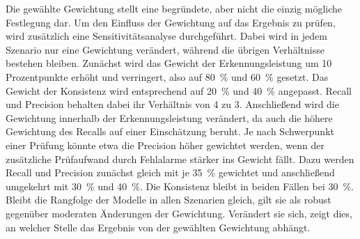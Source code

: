 Die gewählte Gewichtung stellt eine begründete, aber nicht die einzig mögliche Festlegung dar. Um den Einfluss der Gewichtung auf das Ergebnis zu prüfen, wird zusätzlich eine Sensitivitätsanalyse durchgeführt. Dabei wird in jedem Szenario nur eine Gewichtung verändert, während die übrigen Verhältnisse bestehen bleiben. Zunächst wird das Gewicht der Erkennungsleistung um 10 Prozentpunkte erhöht und verringert, also auf 80~\% und 60~\% gesetzt. Das Gewicht der Konsistenz wird entsprechend auf 20~\% und 40~\% angepasst. Recall und Precision behalten dabei ihr Verhältnis von 4 zu 3. Anschließend wird die Gewichtung innerhalb der Erkennungsleistung verändert, da auch die höhere Gewichtung des Recalls auf einer Einschätzung beruht. Je nach Schwerpunkt einer Prüfung könnte etwa die Precision höher gewichtet werden, wenn der zusätzliche Prüfaufwand durch Fehlalarme stärker ins Gewicht fällt. Dazu werden Recall und Precision zunächst gleich mit je 35~\% gewichtet und anschließend umgekehrt mit 30~\% und 40~\%. Die Konsistenz bleibt in beiden Fällen bei 30~\%. Bleibt die Rangfolge der Modelle in allen Szenarien gleich, gilt sie als robust gegenüber moderaten Änderungen der Gewichtung. Verändert sie sich, zeigt dies, an welcher Stelle das Ergebnis von der gewählten Gewichtung abhängt.
